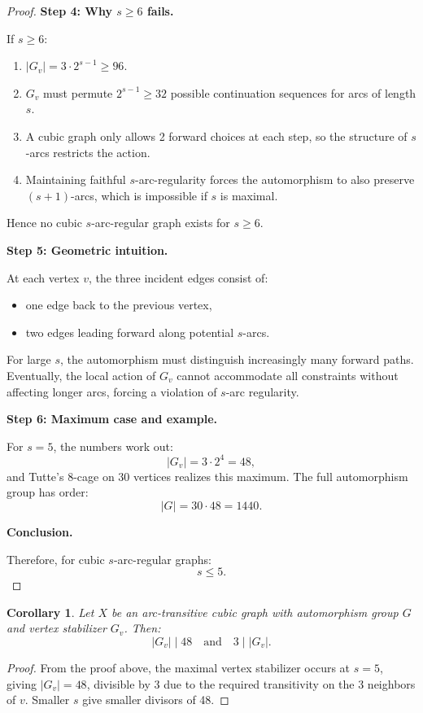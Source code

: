 \documentclass[12pt,a4paper,openany]{book}
\newtheorem{corollary}{Corollary}[section]
\begin{document}
\begin{proof}
\medskip
\textbf{Step 4: Why $s \ge 6$ fails.}  

If $s \ge 6$:
\begin{enumerate}
    \item $|G_v| = 3 \cdot 2^{s-1} \ge 96$.
    \item $G_v$ must permute $2^{s-1}\ge32$ possible continuation sequences for arcs of length $s$.
    \item A cubic graph only allows 2 forward choices at each step, so the structure of $s$-arcs restricts the action.
    \item Maintaining faithful $s$-arc-regularity forces the automorphism to also preserve $(s+1)$-arcs, which is impossible if $s$ is maximal.
\end{enumerate}
Hence no cubic $s$-arc-regular graph exists for $s \ge 6$.

\medskip
\textbf{Step 5: Geometric intuition.}  

At each vertex $v$, the three incident edges consist of:
\begin{itemize}
    \item one edge back to the previous vertex,
    \item two edges leading forward along potential $s$-arcs.
\end{itemize}
For large $s$, the automorphism must distinguish increasingly many forward paths. Eventually, the local action of $G_v$ cannot accommodate all constraints without affecting longer arcs, forcing a violation of $s$-arc regularity.

\medskip
\textbf{Step 6: Maximum case and example.}  

For $s=5$, the numbers work out:
\[
|G_v| = 3 \cdot 2^4 = 48,
\]
and Tutte’s $8$-cage on $30$ vertices realizes this maximum. The full automorphism group has order:
\[
|G| = 30 \cdot 48 = 1440.
\]

\medskip
\textbf{Conclusion.}  

Therefore, for cubic $s$-arc-regular graphs:
\[
s \le 5.
\]
\end{proof}

\begin{corollary}
Let $X$ be an arc-transitive cubic graph with automorphism group $G$ and vertex stabilizer $G_v$. Then:
\[
|G_v| \mid 48 \quad \text{and} \quad 3 \mid |G_v|.
\]
\end{corollary}

\begin{proof}
From the proof above, the maximal vertex stabilizer occurs at $s=5$, giving $|G_v| = 48$, divisible by 3 due to the required transitivity on the 3 neighbors of $v$. Smaller $s$ give smaller divisors of 48.
\end{proof}
\end{document}
